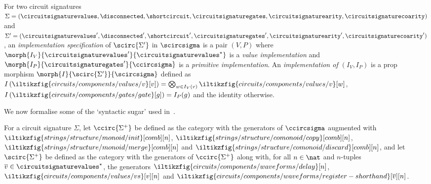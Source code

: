 \begin{definition}[Implementation]
    For two circuit signatures \(\Sigma = (
        \circuitsignaturevalues,
        \disconnected,
        \shortcircuit,
        \circuitsignaturegates,
        \circuitsignaturearity,
        \circuitsignaturecoarity
    )\) and \(\Sigma^\prime = (
        \circuitsignaturevalues^\prime,
        \disconnected^\prime,
        \shortcircuit^\prime,
        \circuitsignaturegates^\prime,
        \circuitsignaturearity^\prime,
        \circuitsignaturecoarity^\prime
    )\), an \emph{implementation specification} of \(\scirc{\Sigma^\prime}\) in
    \(\scircsigma\)
    is a pair \((V,P)\) where \(
        \morph{I_V}{\circuitsignaturevalues^\prime}{\circuitsignaturevalues^\star}
    \) is a \emph{value implementation} and \(
        \morph{I_P}{\circuitsignaturegates^\prime}{\ccircsigma}
    \) is a \emph{primitive implementation}.
    An \emph{implementation of \((I_V, I_P)\)} is a prop morphism \(
        \morph{I}{\scirc{\Sigma^\prime}}{\scircsigma}
    \) defined as \(
        I\left(\iltikzfig{circuits/components/values/v}[v]\right)
        =
        \bigotimes_{w \in I_V(v)} \iltikzfig{circuits/components/values/v}[w]
    \), \(
        I\left(\iltikzfig{circuits/components/gates/gate}[g]\right)
        =
        I_P(g)
    \) and the identity otherwise.
\end{definition}

We now formalise some of the `syntactic sugar' used
in~\cite{ghica2022compositional}.

\begin{definition}
    For a circuit signature \(\Sigma\), let \(\ccirc{\Sigma^+}\) be defined as
    the category with the generators of \(\ccircsigma\) augmented with \(
        \iltikzfig{strings/structure/monoid/init}[comb][n]
    \), \(
        \iltikzfig{strings/structure/comonoid/copy}[comb][n]
    \), \(
        \iltikzfig{strings/structure/monoid/merge}[comb][n]
    \) and \(
        \iltikzfig{strings/structure/comonoid/discard}[comb][n]
    \), and let \(\scirc{\Sigma^+}\) be defined as the category with the generators of
    \(\ccirc{\Sigma^+}\) along with, for all \(n \in \nat\) and \(n\)-tuples
    \(\overline{v} \in \circuitsignaturevalues^\star\), the generators \(
        \iltikzfig{circuits/components/waveforms/delay}[n]
    \), \(
        \iltikzfig{circuits/components/values/vs}[v][n]
    \) and \(
        \iltikzfig{circuits/components/waveforms/register-shorthand}[\overline{v}][n]
    \).
\end{definition}